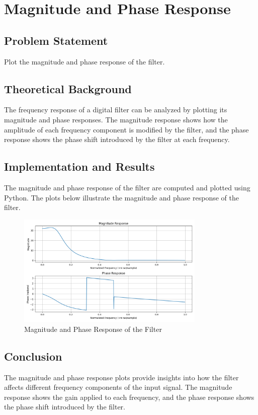 \item[(e)]
\section{Magnitude and Phase Response}

\subsection*{Problem Statement}
Plot the magnitude and phase response of the filter.

\subsection*{Theoretical Background}
The frequency response of a digital filter can be analyzed by plotting its magnitude and phase responses. The magnitude response shows how the amplitude of each frequency component is modified by the filter, and the phase response shows the phase shift introduced by the filter at each frequency.

\subsection*{Implementation and Results}
The magnitude and phase response of the filter are computed and plotted using Python. The plots below illustrate the magnitude and phase response of the filter.

\begin{figure}[h]
    \centering
    \includegraphics[width=0.8\textwidth]{fig/ex3_e_magnitude_phase_response.png}
    \caption{Magnitude and Phase Response of the Filter}
    \label{fig:ex3_e_magnitude_phase_response}
\end{figure}

\subsection*{Conclusion}
The magnitude and phase response plots provide insights into how the filter affects different frequency components of the input signal. The magnitude response shows the gain applied to each frequency, and the phase response shows the phase shift introduced by the filter.
